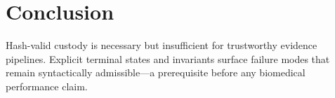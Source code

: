 \documentclass{article}
\begin{document}
\section{Conclusion}
Hash-valid custody is necessary but insufficient for trustworthy evidence pipelines. Explicit terminal states and invariants surface failure modes that remain syntactically admissible---a prerequisite before any biomedical performance claim.





\end{document}
